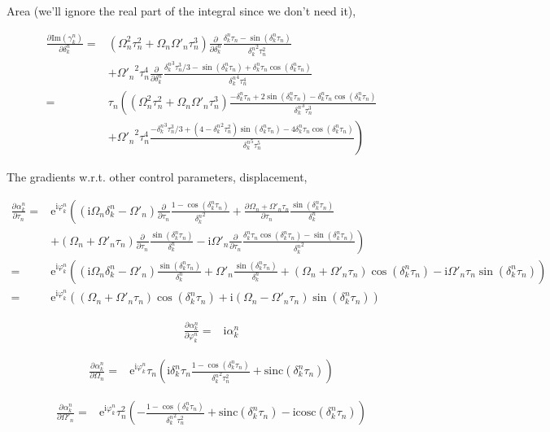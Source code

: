 \documentclass[10pt,fleqn]{article}
\newcommand{\ue}{\mathrm{e}}
\newcommand{\ui}{\mathrm{i}}
\newcommand{\eqar}[1]
{
  \begin{align*}
    #1
  \end{align*}
}
\newcommand{\paren}[1]{{\left({#1}\right)}}
\newcommand{\lparen}[1]{{\left({#1}\right.}}
\newcommand{\rparen}[1]{{\left.{#1}\right)}}
\newcommand{\pdiff}[3][{}]{{\frac{\partial^{#1} {#2}}{\partial {#3}{}^{#1}}}}
\begin{document}
Area (we'll ignore the real part of the integral since we don't need it),
\eqar{
  \pdiff{\mathrm{Im}\paren{\gamma_k^n}}{\delta_k^n}=&
  \paren{\Omega_n^2\tau_n^2+\Omega_n\Omega'_n\tau_n^3}\pdiff{}{\delta_k^n}\frac{\delta_k^n\tau_n-\sin\paren{{\delta_k^n}\tau_n}}{{\delta_k^n}^2\tau_n^2}\\
  &+{\Omega'_n}^2\tau_n^4\pdiff{}{\delta_k^n}\frac{
    {\delta_k^n}^3\tau_n^3/3
    -\sin\paren{{\delta_k^n}\tau_n}
    +{\delta_k^n}\tau_n\cos\paren{{\delta_k^n}\tau_n}
  }{{\delta_k^n}^4\tau_n^4}\\
  =&\tau_n\lparen{
    \paren{\Omega_n^2\tau_n^2+\Omega_n\Omega'_n\tau_n^3}
    \frac{-\delta_k^n\tau_n+2\sin\paren{{\delta_k^n}\tau_n}-{\delta_k^n}\tau_n\cos\paren{{\delta_k^n}\tau_n}}{{\delta_k^n}^3\tau_n^3}
  }\\
  &\rparen{+{\Omega'_n}^2\tau_n^4\frac{
      -{\delta_k^n}^3\tau_n^3/3
      +\paren{4-{\delta_k^n}^2\tau_n^2}\sin\paren{{\delta_k^n}\tau_n}
      -4{\delta_k^n}\tau_n\cos\paren{{\delta_k^n}\tau_n}
    }{{\delta_k^n}^5\tau_n^5}
  }
}

The gradients w.r.t. other control parameters, displacement,
\eqar{
  \pdiff{\alpha_k^n}{\tau_n}=&\ue^{\ui\varphi_k^n}\lparen{
    \paren{\ui\Omega_n\delta_k^n-\Omega'_n}\pdiff{}{\tau_n}\frac{1-\cos\paren{\delta_k^n\tau_n}}{{\delta_k^n}^2}
    +\pdiff{\Omega_n+\Omega'_n\tau_n}{\tau_n}
    \frac{\sin\paren{\delta_k^n\tau_n}}{\delta_k^n}
  }\\
  &\rparen{
    +\paren{\Omega_n+\Omega'_n\tau_n}
    \pdiff{}{\tau_n}\frac{\sin\paren{\delta_k^n\tau_n}}{\delta_k^n}
    -\ui\Omega'_n
    \pdiff{}{\tau_n}\frac{\delta_k^n\tau_n\cos\paren{\delta_k^n\tau_n}-\sin\paren{\delta_k^n\tau_n}}{{\delta_k^n}^2}
  }\\
  =&\ue^{\ui\varphi_k^n}\paren{
    \paren{\ui\Omega_n\delta_k^n-\Omega'_n}\frac{\sin\paren{\delta_k^n\tau_n}}{{\delta_k^n}}
    +\Omega'_n\frac{\sin\paren{\delta_k^n\tau_n}}{\delta_k^n}+\paren{\Omega_n+\Omega'_n\tau_n}
    \cos\paren{\delta_k^n\tau_n}
    -\ui\Omega'_n\tau_n\sin\paren{\delta_k^n\tau_n}
  }\\
  =&\ue^{\ui\varphi_k^n}\paren{
    \paren{\Omega_n+\Omega'_n\tau_n}\cos\paren{\delta_k^n\tau_n}
    +\ui\paren{\Omega_n-\Omega'_n\tau_n}\sin\paren{\delta_k^n\tau_n}
  }
}
\eqar{
  \pdiff{\alpha_k^n}{\varphi_k^n}=&\ui\alpha_k^n
}
\eqar{
  \pdiff{\alpha_k^n}{\Omega_n}=&\ue^{\ui\varphi_k^n}\tau_n\paren{
    \ui\delta_k^n\tau_n\frac{1-\cos\paren{\delta_k^n\tau_n}}{{\delta_k^n}^2\tau_n^2}
    +\mathrm{sinc}\paren{\delta_k^n\tau_n}
  }
}
\eqar{
  \pdiff{\alpha_k^n}{\Omega'_n}=&\ue^{\ui\varphi_k^n}\tau_n^2\paren{
    -\frac{1-\cos\paren{\delta_k^n\tau_n}}{{\delta_k^n}^2\tau_n^2}
    +\mathrm{sinc}\paren{\delta_k^n\tau_n}
    -\ui\mathrm{cosc}\paren{\delta_k^n\tau_n}
  }
}
\end{document}
